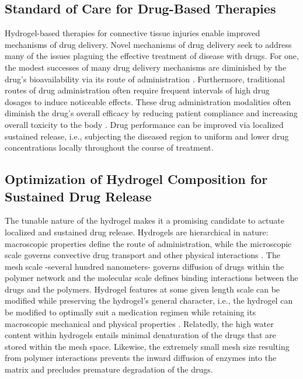 \subsection{Standard of Care for Drug-Based Therapies}
Hydrogel-based therapies for connective tissue injuries enable improved mechanisms of drug delivery. Novel mechanisms of drug delivery seek to address many of the issues plaguing the effective treatment of disease with drugs. For one, the modest successes of many drug delivery mechanisms are diminished by the drug's bioavailability via its route of administration \autocite{nsaids}. Furthermore, traditional routes of drug administration often require frequent intervals of high drug dosages to induce noticeable effects. These drug administration modalities often diminish the drug's overall efficacy by reducing patient compliance and increasing overall toxicity to the body \autocite{nsaids}. Drug performance can be improved via localized sustained release, i.e., subjecting the diseased region to uniform and lower drug concentrations locally throughout the course of treatment.

\subsection{Optimization of Hydrogel Composition for Sustained Drug Release}
The tunable nature of the hydrogel makes it a promising candidate to actuate localized and sustained drug release. Hydrogels are hierarchical in nature: macroscopic properties define the route of administration, while the microscopic scale governs convective drug transport and other physical interactions \autocite{mooney_drug}. The mesh scale -several hundred nanometers- governs diffusion of drugs within the polymer network and the molecular scale defines binding interactions between the drugs and the polymers. Hydrogel features at some given length scale can be modified while preserving the hydrogel's general character, i.e., the hydrogel can be modified to optimally suit a medication regimen while retaining its macroscopic mechanical and physical properties \autocite{mooney_drug}.  Relatedly, the high water content within hydrogels entails minimal denaturation of the drugs that are stored within the mesh space. Likewise, the extremely small mesh size resulting from polymer interactions prevents the inward diffusion of enzymes into the matrix and precludes premature degradation of the drugs. 

